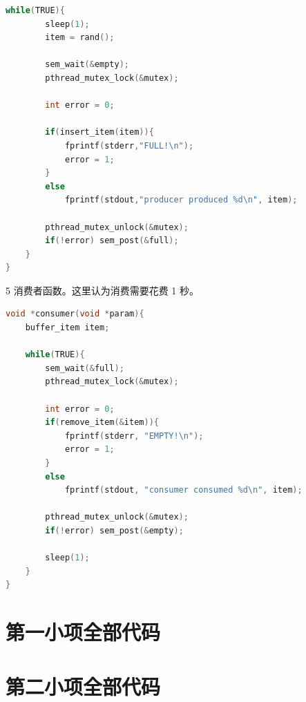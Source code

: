 \documentclass[12pt,a4paper]{article}
\newenvironment{problems}{\begin{list}{}{\renewcommand{\makelabel}[1]{\textbf{##1}\hfil}}}{\end{list}}
\newenvironment{steps}{\begin{list}{}{\renewcommand{\makelabel}[1]{##1.\hfil}}}{\end{list}}
\providecommand{\code}[2]{}
\begin{document}
\begin{problems}
\begin{steps}
\begin{lstlisting}[language=c]
    while(TRUE){
        sleep(1);
        item = rand();
        
        sem_wait(&empty);
        pthread_mutex_lock(&mutex);
        
        int error = 0;

        if(insert_item(item)){
            fprintf(stderr,"FULL!\n");
            error = 1;
        }
        else
            fprintf(stdout,"producer produced %d\n", item);

        pthread_mutex_unlock(&mutex);
        if(!error) sem_post(&full);
    }
}
        \end{lstlisting} 
        \item[5] 消费者函数。这里认为消费需要花费 1 秒。
        \begin{lstlisting}[language=c]
void *consumer(void *param){
    buffer_item item;

    while(TRUE){
        sem_wait(&full);
        pthread_mutex_lock(&mutex);
        
        int error = 0;
        if(remove_item(&item)){
            fprintf(stderr, "EMPTY!\n");
            error = 1;
        }
        else
            fprintf(stdout, "consumer consumed %d\n", item);

        pthread_mutex_unlock(&mutex);
        if(!error) sem_post(&empty);

        sleep(1);
    }
}
        \end{lstlisting} 
    \end{steps}
\end{problems}

\begin{appendices}
    \section{第一小项全部代码}
    \code{src/posix/threadpool.c}{c}
    \section{第二小项全部代码}
    \code{src/pcp/Makefile}{}
    \code{src/pcp/pcp.c}{c}
\end{appendices}
\end{document}
